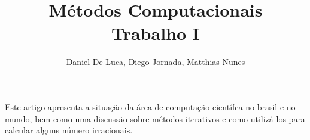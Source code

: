 \documentclass[a4paper]{article}
\author{Daniel De Luca, Diego Jornada, Matthias Nunes}
\title{Métodos Computacionais \\ Trabalho I}
\begin{document}
\maketitle

\begin{resumo}

	Este artigo apresenta a situação da área de computação científca no brasil e
	no mundo, bem como uma discussão sobre métodos iterativos e como utilizá-los
	para calcular alguns número irracionais.

\end{resumo}








\end{document}
